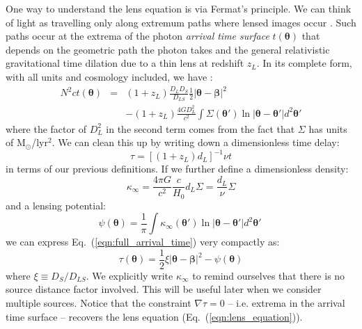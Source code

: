 \documentclass[galley,usenatbib]{mn2e}
\newcommand{\Msun}{\ensuremath{\mathrm{M}_\odot}}
\newcommand{\eqnref}[1] {Eq.~(\ref{#1})}
\renewcommand{\vec}[1]{\ensuremath{\boldsymbol{#1}}}
\begin{document}
One way to understand the lens equation is via Fermat's principle. We can think of light as travelling only 
along extremum paths where lensed images occur \citep{1986ApJ...310..568B}. Such paths occur at the extrema of the photon {\it arrival time surface} $t(\vec\theta)$ that depends on the geometric path the photon takes and the general relativistic gravitational time dilation
due to a thin lens at redshift $z_L$. In its complete form, with all units
and cosmology included, we have \citep{1986ApJ...310..568B}:
%
\begin{eqnarray}
N^2ct(\vec\theta) & = & (1+z_L)\frac{D_{L}D_{S}}{D_{LS}}\frac12 |\vec\theta - \vec\beta|^2 \nonumber \\
& & - (1+z_L)\frac{4GD_{L}^2}{c^2}\int \Sigma(\vec\theta') \ln |\vec\theta-\vec\theta'| d^2\vec\theta'
\label{eqn:full_arrival_time}
\end{eqnarray}
%
where the factor of $D_L^2$ in the second term comes from the fact that $\Sigma$
has units of \Msun/lyr$^2$. We can clean this up by writing down a dimensionless time
delay:
%
\begin{equation}
\tau = \left[ (1+z_L) d_L\right]^{-1}\nu t
\label{tau}
\end{equation}
%
in terms of our previous definitions. If we
further define a dimensionless density:
%
\begin{equation}
\kappa_\infty = \frac{4\pi G}{c^2}\frac{c}{H_0}d_L\Sigma
              = \frac{d_L}{\nu}\Sigma
\end{equation}
%
and a lensing potential:
%
\begin{equation}
\psi(\vec\theta) = \frac1\pi \int \kappa_\infty(\vec\theta') \ln|\vec\theta - \vec\theta'| d^2\vec\theta'\
\label{lensing potential}
\end{equation}
%
we can express \eqnref{eqn:full_arrival_time} very compactly as:
%
\begin{equation}
\tau(\vec\theta) = \frac12 \xi |\vec\theta-\vec\beta|^2 - \psi(\vec\theta)
\label{arrival time}
\end{equation}
%
where $\xi \equiv D_{S}/D_{LS}$. We explicitly write $\kappa_\infty$ to remind ourselves
that there is no source distance factor involved. This will be useful later when we consider
multiple sources. Notice that the constraint $\nabla \tau = 0$ -- i.e. extrema in the arrival time surface -- recovers the lens equation (\eqnref{eqn:lens_equation}).
\end{document}
